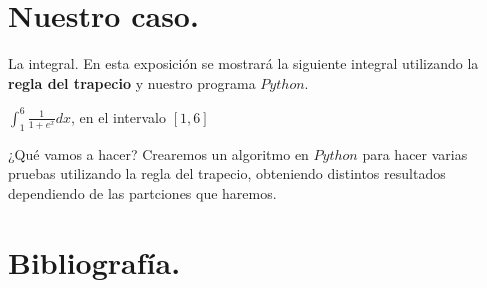 \documentclass{beamer}
\begin{document}
  \section{Nuestro caso.}
  \begin{frame}
    \begin{block}{La integral.}
      En esta exposición se mostrará la siguiente integral utilizando la \textbf{regla del trapecio} y nuestro programa $Python$.\\
      \begin{center}
	$\int_{1}^{6}\frac{1}{1+e^x}dx$, en el intervalo $[1,6]$
      \end{center}
    \end{block}

    \begin{block}{¿Qué vamos a hacer?}
      Crearemos un algoritmo en \textbf{$Python$} para hacer varias pruebas utilizando la regla del trapecio, obteniendo distintos resultados dependiendo de las partciones que haremos.
    \end{block}
  \end{frame}
  \section{}
  \begin{frame}
    
  \end{frame}

  \section{Bibliografía.}
  \begin{thebibliography}{00}
    \bibitem{}
    
  \end{thebibliography}

\end{document}
